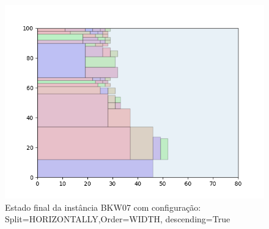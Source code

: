 \begin{figure}[H]
    \centering
    \caption[]{Estado final da instância BKW07 com configuração: Split=HORIZONTALLY,Order=WIDTH, descending=True}
    \label{fig:bkw07-horizontally-width-true}
    \includegraphics[scale=0.5]{output/figures/bkw/bkw07/horizontally/width/true/00}
\end{figure}